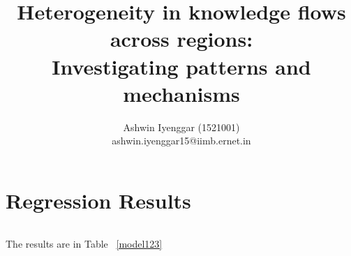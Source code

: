 \documentclass[12pt]{article}
\begin{document}
\title{Heterogeneity in knowledge flows across regions:\\ Investigating patterns and mechanisms}
\author{Ashwin Iyenggar  (1521001) \\ ashwin.iyenggar15@iimb.ernet.in} 


\maketitle
\thispagestyle{empty}

\section{Regression Results}
\begin{lstlisting}
\end{lstlisting}
The results are in Table ~\ref{model123}
\begin{landscape}
\begin{centering}

\newpage

\end{centering}
\end{landscape}
\end{document}
